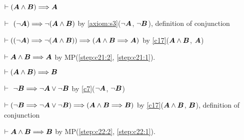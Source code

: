\begin{dc}\label{c21}
$\vdash(\boldsymbol{A}\land\boldsymbol{B})\Longrightarrow\boldsymbol{A}$
\end{dc}

\begin{pf}
\item\label{step:c21:1} $\vdash\phantom{(}(\neg\boldsymbol{A})\Longrightarrow\neg(\boldsymbol{A}\land\boldsymbol{B})$
by \ref{axiom:s3}($\neg\boldsymbol{A}$, $\neg\boldsymbol{B}$),
definition of conjunction
\item\label{step:c21:2} $\vdash((\neg\boldsymbol{A})\Longrightarrow\neg(\boldsymbol{A}\land\boldsymbol{B}))\Longrightarrow(\boldsymbol{A}\land\boldsymbol{B}\Longrightarrow\boldsymbol{A})$
by \ref{c17}($\boldsymbol{A}\land\boldsymbol{B}$, $\boldsymbol{A}$)
\item\label{step:c21:3} $\vdash\boldsymbol{A}\land\boldsymbol{B}\Longrightarrow\boldsymbol{A}$
by MP(\ref{step:c21:2}, \ref{step:c21:1}).
\end{pf}

\begin{dc}\label{c22}
$\vdash(\boldsymbol{A}\land\boldsymbol{B})\Longrightarrow\boldsymbol{B}$
\end{dc}

\begin{pf}
\item\label{step:c22:1} $\vdash\phantom{(}\neg\boldsymbol{B}\Longrightarrow\neg\boldsymbol{A}\lor\neg\boldsymbol{B}$
by \ref{c7}($\neg\boldsymbol{A}$, $\neg\boldsymbol{B}$)
\item\label{step:c22:2} $\vdash(\neg\boldsymbol{B}\Longrightarrow\neg\boldsymbol{A}\lor\neg\boldsymbol{B})\Longrightarrow(\boldsymbol{A}\land\boldsymbol{B}\Longrightarrow\boldsymbol{B})$
by \ref{c17}($\boldsymbol{A}\land\boldsymbol{B}$, $\boldsymbol{B}$),
definition of conjunction
\item\label{step:c22:3} $\vdash\boldsymbol{A}\land\boldsymbol{B}\Longrightarrow\boldsymbol{B}$
by MP(\ref{step:c22:2}, \ref{step:c22:1}).
\end{pf}
